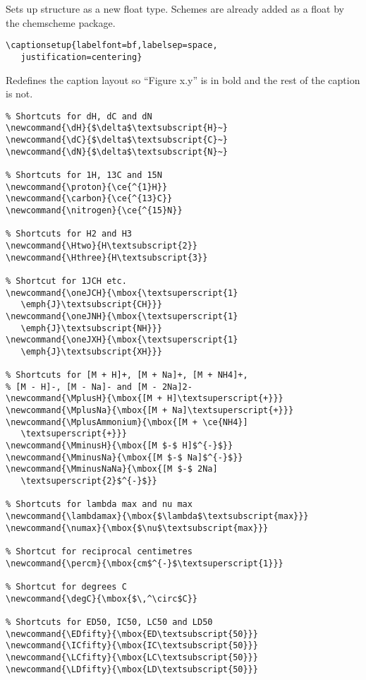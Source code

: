 \normalsize\doublespacing
Sets up structure as a new float type.  Schemes are already added as a float by the chemscheme package.

\small\singlespacing
\begin{verbatim}
\captionsetup{labelfont=bf,labelsep=space,
   justification=centering}
\end{verbatim}

\normalsize\doublespacing
Redefines the caption layout so ``Figure x.y'' is in bold and the rest of the caption is not.

\small\singlespacing
\begin{verbatim}
% Shortcuts for dH, dC and dN
\newcommand{\dH}{$\delta$\textsubscript{H}~}
\newcommand{\dC}{$\delta$\textsubscript{C}~}
\newcommand{\dN}{$\delta$\textsubscript{N}~}

% Shortcuts for 1H, 13C and 15N
\newcommand{\proton}{\ce{^{1}H}}
\newcommand{\carbon}{\ce{^{13}C}}
\newcommand{\nitrogen}{\ce{^{15}N}}

% Shortcuts for H2 and H3
\newcommand{\Htwo}{H\textsubscript{2}}
\newcommand{\Hthree}{H\textsubscript{3}}

% Shortcut for 1JCH etc.
\newcommand{\oneJCH}{\mbox{\textsuperscript{1}
   \emph{J}\textsubscript{CH}}}
\newcommand{\oneJNH}{\mbox{\textsuperscript{1}
   \emph{J}\textsubscript{NH}}}
\newcommand{\oneJXH}{\mbox{\textsuperscript{1}
   \emph{J}\textsubscript{XH}}}

% Shortcuts for [M + H]+, [M + Na]+, [M + NH4]+,
% [M - H]-, [M - Na]- and [M - 2Na]2-
\newcommand{\MplusH}{\mbox{[M + H]\textsuperscript{+}}}
\newcommand{\MplusNa}{\mbox{[M + Na]\textsuperscript{+}}}
\newcommand{\MplusAmmonium}{\mbox{[M + \ce{NH4}]
   \textsuperscript{+}}}
\newcommand{\MminusH}{\mbox{[M $-$ H]$^{-}$}}
\newcommand{\MminusNa}{\mbox{[M $-$ Na]$^{-}$}}
\newcommand{\MminusNaNa}{\mbox{[M $-$ 2Na]
   \textsuperscript{2}$^{-}$}}

% Shortcuts for lambda max and nu max
\newcommand{\lambdamax}{\mbox{$\lambda$\textsubscript{max}}}
\newcommand{\numax}{\mbox{$\nu$\textsubscript{max}}}

% Shortcut for reciprocal centimetres
\newcommand{\percm}{\mbox{cm$^{-}$\textsuperscript{1}}}

% Shortcut for degrees C
\newcommand{\degC}{\mbox{$\,^\circ$C}}

% Shortcuts for ED50, IC50, LC50 and LD50
\newcommand{\EDfifty}{\mbox{ED\textsubscript{50}}}
\newcommand{\ICfifty}{\mbox{IC\textsubscript{50}}}
\newcommand{\LCfifty}{\mbox{LC\textsubscript{50}}}
\newcommand{\LDfifty}{\mbox{LD\textsubscript{50}}}
\end{verbatim}

